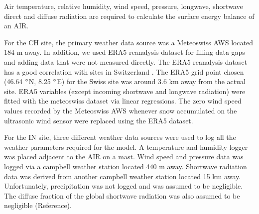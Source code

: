 \documentclass[utf8]{frontiersSCNS} %
\begin{document}
Air temperature, relative humidity, wind speed, pressure, longwave, shortwave direct and diffuse radiation are required
to calculate the surface energy balance of an AIR.

For the CH site, the primary weather data source was a Meteoswiss AWS located 184 m away. In addition, we used ERA5
reanalysis dataset \citep{era5} for filling data gaps and adding data that were not measured directly.  The ERA5
reanalysis dataset has a good correlation with sites in Switzerland \citep{Scherrer_2020}. The ERA5 grid point
chosen (46.64 $\degree$N, 8.25 $\degree$E) for the Swiss site was around 3.6 km away from the actual site.  ERA5
variables (except incoming shortwave and longwave radiation) were fitted with the meteoswiss dataset via linear
regressions. The zero wind speed values recorded by the Meteoswiss AWS whenever snow accumulated on the ultrasonic
wind sensor were replaced using the ERA5 dataset.

For the IN site, three different weather data sources were used to log all the weather parameters required for the
model. A temperature and humidity logger was placed adjacent to the AIR on a mast. Wind speed and pressure data was
logged via a campbell weather station located 440 m away. Shortwave radiation data was derived from another campbell
weather station located 15 km away. Unfortunately, precipitation was not logged and was assumed to be negligible. The
diffuse fraction of the global shortwave radiation was also assumed to be negligible (Reference).
\end{document}
